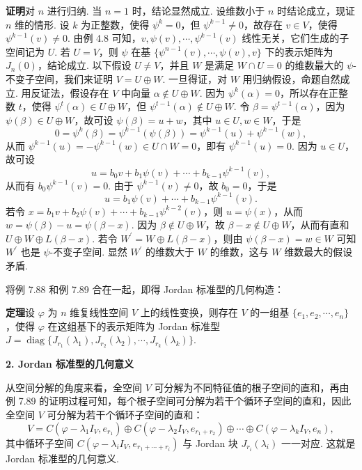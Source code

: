 \documentclass[UTF8, 12pt, fontset=fandol, oneside]{ctexart}
\begin{document}
\noindent\textbf{证明}\quad 对 $n$ 进行归纳. 当 $n=1$ 时，结论显然成立. 设维数小于 $n$ 时结论成立，现证 $n$ 维的情形. 设 $k$ 为正整数，使得 $\psi^k=0$，但 $\psi^{k-1}\ne0$，故存在 $v\in V$，使得 $\psi^{k-1}(v)\ne0$. 由例 4.8 可知，$v,\psi(v),\cdots,\psi^{k-1}(v)$ 线性无关，它们生成的子空间记为 $U$. 若 $U=V$，则 $\psi$ 在基 $\{\psi^{n-1}(v),\cdots,\psi(v),v\}$ 下的表示矩阵为 $J_n(0)$，结论成立. 以下假设 $U\ne V$，并且 $W$ 是满足 $W\cap U=0$ 的维数最大的 $\psi$-不变子空间，我们来证明 $V=U\oplus W$. 一旦得证，对 $W$ 用归纳假设，命题自然成立. 用反证法，假设存在 $V$ 中向量 $\alpha\notin U\oplus W$. 因为 $\psi^k(\alpha)=0$，所以存在正整数 $t$，使得 $\psi^t(\alpha)\in U\oplus W$，但 $\psi^{t-1}(\alpha)\notin U\oplus W$. 令 $\beta=\psi^{t-1}(\alpha)$，因为 $\psi(\beta)\in U\oplus W$，故可设 $\psi(\beta)=u+w$，其中 $u\in U,w\in W$，于是
\[
0=\psi^k(\beta)=\psi^{k-1}(\psi(\beta))=\psi^{k-1}(u)+\psi^{k-1}(w),
\]
从而 $\psi^{k-1}(u)=-\psi^{k-1}(w)\in U\cap W=0$，即有 $\psi^{k-1}(u)=0$. 因为 $u\in U$，故可设
\[
u=b_0v+b_1\psi(v)+\cdots+b_{k-1}\psi^{k-1}(v),
\]
从而有 $b_0\psi^{k-1}(v)=0$. 由于 $\psi^{k-1}(v)\ne0$，故 $b_0=0$，于是
\[
u=b_1\psi(v)+\cdots+b_{k-1}\psi^{k-1}(v).
\]
若令 $x=b_1v+b_2\psi(v)+\cdots+b_{k-1}\psi^{k-2}(v)$，则 $u=\psi(x)$，从而 $w=\psi(\beta)-u=\psi(\beta-x)$. 因为 $\beta\notin U\oplus W$，故 $\beta-x\notin U\oplus W$，从而有直和 $U\oplus W\oplus L(\beta-x)$. 若令 $W^{\prime}=W\oplus L(\beta-x)$，则由 $\psi(\beta-x)=w\in W$ 可知 $W^{\prime}$ 也是 $\psi$-不变子空间. 显然 $W^{\prime}$ 的维数大于 $W$ 的维数，这与 $W$ 维数最大的假设矛盾.

将例 7.88 和例 7.89 合在一起，即得 Jordan 标准型的几何构造：

\noindent\textbf{定理}\quad 设 $\varphi$ 为 $n$ 维复线性空间 $V$ 上的线性变换，则存在 $V$ 的一组基 $\{e_1,e_2,\cdots,e_n\}$，使得 $\varphi$ 在这组基下的表示矩阵为 Jordan 标准型 $J=\operatorname{diag}\{J_{r_1}(\lambda_1),J_{r_2}(\lambda_2),\cdots,J_{r_k}(\lambda_k)\}$.

\noindent\textbf{2. Jordan 标准型的几何意义}

从空间分解的角度来看，全空间 $V$ 可分解为不同特征值的根子空间的直和，再由例 7.89 的证明过程可知，每个根子空间可分解为若干个循环子空间的直和，因此全空间 $V$ 可分解为若干个循环子空间的直和：
\begin{equation}
V=C(\varphi-\lambda_1I_V,e_{r_1})\oplus C(\varphi-\lambda_2I_V,e_{r_1+r_2})\oplus\cdots\oplus C(\varphi-\lambda_kI_V,e_n),
\tag{7.17}
\end{equation}
其中循环子空间 $C(\varphi-\lambda_iI_V,e_{r_1+\cdots+r_i})$ 与 Jordan 块 $J_{r_i}(\lambda_i)$ 一一对应. 这就是 Jordan 标准型的几何意义.
\end{document}
